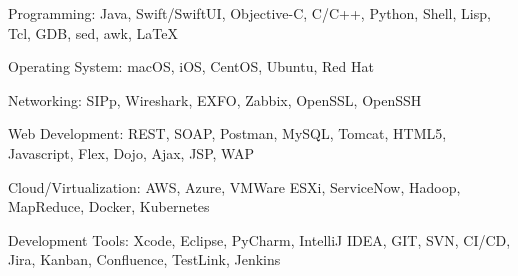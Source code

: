 


\begin{cvskills}


\cvskill
{Programming:} %
{Java, Swift/SwiftUI, Objective-C, C/C++, Python, Shell, Lisp, Tcl, GDB, sed, awk, \LaTeX} %


\cvskill
{Operating System:} %
{macOS, iOS, CentOS, Ubuntu, Red Hat} %

\cvskill
{Networking:} %
{SIPp, Wireshark, EXFO, Zabbix, OpenSSL, OpenSSH } %


\cvskill
{Web Development:} %
{REST, SOAP, Postman, MySQL, Tomcat,  HTML5, Javascript, Flex, Dojo, Ajax, JSP, WAP} %


\cvskill
{Cloud/Virtualization:} %
{AWS, Azure, VMWare ESXi, ServiceNow, Hadoop, MapReduce, Docker, Kubernetes} %

\cvskill
{Development Tools:} %
{Xcode, Eclipse, PyCharm, IntelliJ IDEA, GIT, SVN, CI/CD, Jira, Kanban, Confluence, TestLink, Jenkins} %


\end{cvskills}
